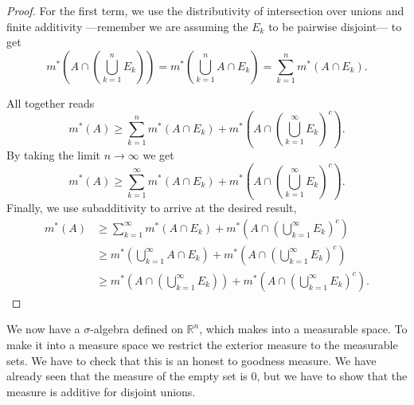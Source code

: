 \documentclass[12pt,oneside]{book}
\numberwithin{table}{section}
\numberwithin{equation}{section}
\numberwithin{figure}{section}
\newcommand{\R}{\mathbb{R}}
\newcommand{\ext}[1]{m^* \! \left( #1 \right)}
\begin{document}
\begin{proof}
	For the first term, we use the distributivity of intersection over unions and finite additivity ---remember we are assuming the \( E_k \) to be pairwise disjoint--- to get
	\begin{equation*}
		\ext{A \cap \left(\bigcup_{k = 1}^n E_k\right)} = \ext{\bigcup_{k = 1}^n A \cap E_k} = \sum_{k = 1}^{n} \ext{A \cap E_k}.
	\end{equation*}

	All together reads
	\begin{equation*}
		\ext{A} \geq \sum_{k = 1}^{n} \ext{A \cap E_k} + \ext{A \cap \left(\bigcup_{k = 1}^\infty E_k\right)^c}.
	\end{equation*}
	By taking the limit \( n \to \infty \) we get
	\begin{equation*}
		\ext{A} \geq \sum_{k = 1}^\infty \ext{A \cap E_k} + \ext{A \cap \left(\bigcup_{k = 1}^\infty E_k\right)^c}.
	\end{equation*}
	Finally, we use subadditivity to arrive at the desired result,
	\begin{align*}
		\ext{A} & \geq \sum_{k = 1}^\infty \ext{A \cap E_k} + \ext{A \cap \left(\bigcup_{k = 1}^\infty E_k\right)^c} \\
						& \geq \ext{\bigcup_{k = 1}^\infty A \cap E_k} + \ext{A \cap \left(\bigcup_{k = 1}^\infty E_k\right)^c} \\
						& \geq \ext{A \cap \left(\bigcup_{k = 1}^\infty E_k\right)} + \ext{A \cap \left(\bigcup_{k = 1}^\infty E_k\right)^c}.
	\end{align*}
\end{proof}

We now have a \( \sigma \)-algebra defined on \( \R^n \), which makes into a measurable space. To make it into a measure space we restrict the exterior measure to the measurable sets. We have to check that this is an honest to goodness measure. We have already seen that the measure of the empty set is 0, but we have to show that the measure is additive for disjoint unions.
\end{document}
